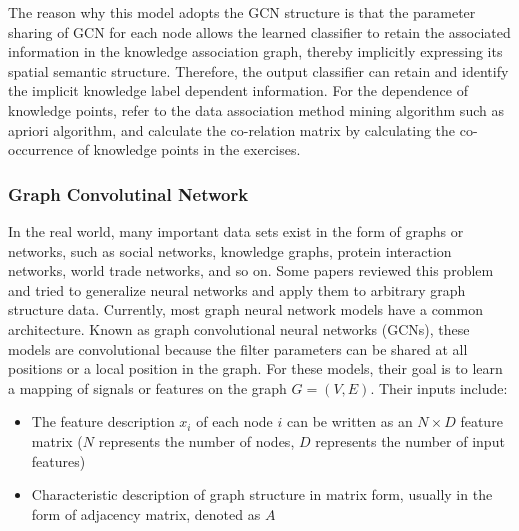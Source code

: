 The reason why this model adopts the GCN structure is that the parameter sharing of GCN for each node allows the learned classifier to retain the associated information in the knowledge association graph, thereby implicitly expressing its spatial semantic structure. Therefore, the output classifier can retain and identify the implicit knowledge label dependent information. For the dependence of knowledge points, refer to the data association method mining algorithm such as apriori algorithm, and calculate the co-relation matrix by calculating the co-occurrence of knowledge points in the exercises.

\subsubsection{Graph Convolutinal Network}

In the real world, many important data sets exist in the form of graphs or networks, such as social networks, knowledge graphs, protein interaction networks, world trade networks, and so on. Some papers reviewed this problem and tried to generalize neural networks and apply them to arbitrary graph structure data\cite{wu2018socialgcn,dettmers2018convolutional}. Currently, most graph neural network models have a common architecture. Known as graph convolutional neural networks (GCNs), these models are convolutional because the filter parameters can be shared at all positions or a local position in the graph. For these models, their goal is to learn a mapping of signals or features on the graph \(G=(V,E)\). Their inputs include:

\begin{itemize}
	\item The feature description \(x_i\) of each node \(i\) can be written as an \(N\times D\) feature matrix (\(N\) represents the number of nodes, \(D\) represents the number of input features)
	\item Characteristic description of graph structure in matrix form, usually in the form of adjacency matrix, denoted as \(A\)
\end{itemize}

